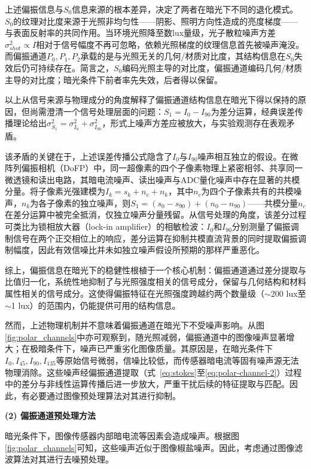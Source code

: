 上述偏振信息与$S_0$信息来源的根本差异，决定了两者在暗光下不同的退化模式。$S_0$的纹理对比度来源于光照非均匀性——阴影、照明方向性造成的亮度梯度——与表面反射率的共同作用。当环境光照降至数lux量级，光子散粒噪声方差$\sigma_{shot}^2 \propto I$相对于信号幅度不再可忽略，依赖光照梯度的纹理信息首先被噪声淹没。而偏振通道$P_0, P_1, P_2$承载的是与光照无关的几何/材质对比度，其结构信息在$S_0$失效后仍可持续存在。简言之，$S_0$编码光照主导的对比度，偏振通道编码几何/材质主导的对比度；暗光条件下前者率先失效，后者得以保留。

以上从信号来源与物理成分的角度解释了偏振通道结构信息在暗光下得以保持的原因，但尚需澄清一个信号处理层面的问题：$S_1 = I_0 - I_{90}$为差分运算，经典误差传播理论给出$\sigma_{S_1}^2 = \sigma_{I_0}^2 + \sigma_{I_{90}}^2$，形式上噪声方差应被放大，与实验观测存在表观矛盾。

该矛盾的关键在于，上述误差传播公式隐含了$I_0$与$I_{90}$噪声相互独立的假设。在微阵列偏振相机（DoFP）中，同一超像素的四个子像素物理上紧密相邻、共享同一微透镜和读出电路，其暗电流噪声、读出噪声与ADC量化噪声中存在显著的共模分量\cite{perkins2010signal,bai2022noise}。将子像素光强建模为$I_k = s_k + n_c + n_k$，其中$n_c$为四个子像素共有的共模噪声，$n_k$为各子像素的独立噪声，则$S_1 = (s_0 - s_{90}) + (n_0 - n_{90})$——共模分量$n_c$在差分运算中被完全抵消，仅独立噪声分量残留。从信号处理的角度，该差分过程可类比为锁相放大器（lock-in amplifier）的相敏检波：$I_0$和$I_{90}$分别测量了偏振调制信号在两个正交相位上的响应，差分运算在抑制共模直流背景的同时提取偏振调制幅度，因此有效信噪比并未如独立噪声假设所预期的那样严重恶化。

综上，偏振信息在暗光下的稳健性根植于一个核心机制：偏振通道通过差分提取与比值归一化，系统性地抑制了与光照强度相关的信号成分，保留与几何结构和材料属性相关的信号成分。这使得偏振特征在光照强度跨越约两个数量级（$\sim$200 lux至$\sim$1 lux）的范围内，仍能提供可用的结构信息。

然而，上述物理机制并不意味着偏振通道在暗光下不受噪声影响。从图\ref{fig:polar_channels}中亦可观察到，随光照减弱，偏振通道中的图像噪声显著增大；在极暗条件下，噪声已严重劣化图像质量。其原因是，在暗光条件下$I_0, I_{45}, I_{90}, I_{135}$等原始信号微弱，信噪比较低，而传感器暗电流等固有噪声源无法物理消除。这些噪声经偏振通道提取（式~\ref{eq:stokes}至\ref{eq:polar-channel-2}）过程中的差分与非线性运算传播后进一步放大，严重干扰后续的特征提取与匹配。因此，有必要通过图像预处理算法对其进行抑制。


\textbf{(2) 偏振通道预处理方法}


暗光条件下，图像传感器内部暗电流等因素会造成噪声。根据图\ref{fig:polar_channels}可知，这些噪声近似于图像椒盐噪声。因此，考虑通过图像滤波算法对其进行去噪预处理。

